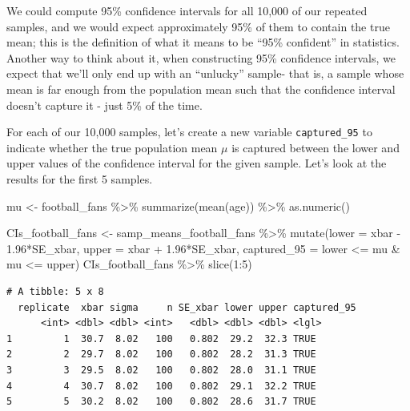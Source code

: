 \documentclass[
  letterpaper,
  DIV=11,
  numbers=noendperiod]{scrreprt}
\newenvironment{Shaded}{\begin{snugshade}}{\end{snugshade}}
\newcommand{\AttributeTok}[1]{\textcolor[rgb]{0.40,0.45,0.13}{#1}}
\newcommand{\DecValTok}[1]{\textcolor[rgb]{0.68,0.00,0.00}{#1}}
\newcommand{\FloatTok}[1]{\textcolor[rgb]{0.68,0.00,0.00}{#1}}
\newcommand{\FunctionTok}[1]{\textcolor[rgb]{0.28,0.35,0.67}{#1}}
\newcommand{\NormalTok}[1]{\textcolor[rgb]{0.00,0.23,0.31}{#1}}
\newcommand{\OtherTok}[1]{\textcolor[rgb]{0.00,0.23,0.31}{#1}}
\newcommand{\SpecialCharTok}[1]{\textcolor[rgb]{0.37,0.37,0.37}{#1}}
\theoremstyle{definition}
\theoremstyle{remark}
\begin{document}
We could compute 95\% confidence intervals for all 10,000 of our
repeated samples, and we would expect approximately 95\% of them to
contain the true mean; this is the definition of what it means to be
``95\% confident'' in statistics. Another way to think about it, when
constructing 95\% confidence intervals, we expect that we'll only end up
with an ``unlucky'' sample- that is, a sample whose mean is far enough
from the population mean such that the confidence interval doesn't
capture it - just 5\% of the time.

For each of our 10,000 samples, let's create a new variable
\texttt{captured\_95} to indicate whether the true population mean
\(\mu\) is captured between the lower and upper values of the confidence
interval for the given sample. Let's look at the results for the first 5
samples.

\begin{Shaded}
\begin{Highlighting}[]
\NormalTok{mu }\OtherTok{\textless{}{-}}\NormalTok{ football\_fans }\SpecialCharTok{\%\textgreater{}\%} 
  \FunctionTok{summarize}\NormalTok{(}\FunctionTok{mean}\NormalTok{(age)) }\SpecialCharTok{\%\textgreater{}\%} 
  \FunctionTok{as.numeric}\NormalTok{()}

\NormalTok{CIs\_football\_fans }\OtherTok{\textless{}{-}}\NormalTok{ samp\_means\_football\_fans }\SpecialCharTok{\%\textgreater{}\%} 
  \FunctionTok{mutate}\NormalTok{(}\AttributeTok{lower =}\NormalTok{ xbar }\SpecialCharTok{{-}} \FloatTok{1.96}\SpecialCharTok{*}\NormalTok{SE\_xbar,}
         \AttributeTok{upper =}\NormalTok{ xbar }\SpecialCharTok{+} \FloatTok{1.96}\SpecialCharTok{*}\NormalTok{SE\_xbar,}
         \AttributeTok{captured\_95 =}\NormalTok{ lower }\SpecialCharTok{\textless{}=}\NormalTok{ mu }\SpecialCharTok{\&}\NormalTok{ mu }\SpecialCharTok{\textless{}=}\NormalTok{ upper)}
\NormalTok{CIs\_football\_fans }\SpecialCharTok{\%\textgreater{}\%} 
  \FunctionTok{slice}\NormalTok{(}\DecValTok{1}\SpecialCharTok{:}\DecValTok{5}\NormalTok{)}
\end{Highlighting}
\end{Shaded}

\begin{verbatim}
# A tibble: 5 x 8
  replicate  xbar sigma     n SE_xbar lower upper captured_95
      <int> <dbl> <dbl> <int>   <dbl> <dbl> <dbl> <lgl>      
1         1  30.7  8.02   100   0.802  29.2  32.3 TRUE       
2         2  29.7  8.02   100   0.802  28.2  31.3 TRUE       
3         3  29.5  8.02   100   0.802  28.0  31.1 TRUE       
4         4  30.7  8.02   100   0.802  29.1  32.2 TRUE       
5         5  30.2  8.02   100   0.802  28.6  31.7 TRUE       
\end{verbatim}
\end{document}
